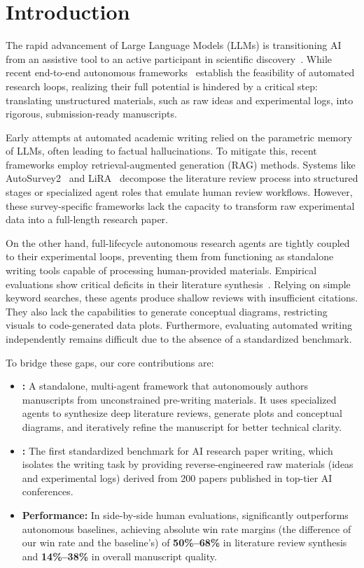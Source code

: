 \section{Introduction}

The rapid advancement of Large Language Models (LLMs) is transitioning AI from an assistive tool to an active participant in scientific discovery~\citep{eger2025transforming}. While recent end-to-end autonomous frameworks~\citep{lu2024aiscientist, yamada2025aiscientistv2} establish the feasibility of automated research loops, realizing their full potential is hindered by a critical step: translating unstructured materials, such as raw ideas and experimental logs, into rigorous, submission-ready manuscripts.

Early attempts at automated academic writing relied on the parametric memory of LLMs, often leading to factual hallucinations. To mitigate this, recent frameworks employ retrieval-augmented generation (RAG) methods. Systems like AutoSurvey2~\citep{wu2025autosurvey2} and LiRA~\citep{go2025lira} decompose the literature review process into structured stages or specialized agent roles that emulate human review workflows. However, these survey-specific frameworks lack the capacity to transform raw experimental data into a full-length research paper.

On the other hand, full-lifecycle autonomous research agents are tightly coupled to their experimental loops, preventing them from functioning as standalone writing tools capable of processing human-provided materials. Empirical evaluations show critical deficits in their literature synthesis~\citep{beel2025evaluating, tang2025large}. Relying on simple keyword searches, these agents produce shallow reviews with insufficient citations. They also lack the capabilities to generate conceptual diagrams, restricting visuals to code-generated data plots. Furthermore, evaluating automated writing independently remains difficult due to the absence of a standardized benchmark.

To bridge these gaps, our core contributions are:
\begin{itemize}
    \item \textbf{\ourmethod{}:} A standalone, multi-agent framework that autonomously authors \mylatex{} manuscripts from unconstrained pre-writing materials. It uses specialized agents to synthesize deep literature reviews, generate plots and conceptual diagrams, and iteratively refine the manuscript for better technical clarity.
    \item \textbf{\ourdataset{}:} The first standardized benchmark for AI research paper writing, which isolates the writing task by providing reverse-engineered raw materials (ideas and experimental logs) derived from 200 papers published in top-tier AI conferences.
    \item \textbf{Performance:} In side-by-side human evaluations, \ourmethod{} significantly outperforms autonomous baselines, achieving absolute win rate margins (the difference of our win rate and the baseline's) of \textbf{50\%--68\%} in literature review synthesis and \textbf{14\%--38\%} in overall manuscript quality.
\end{itemize}